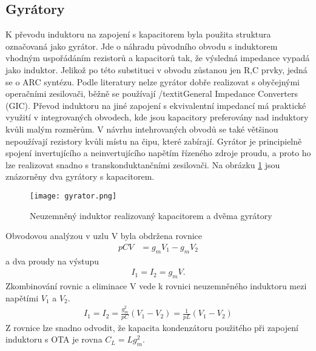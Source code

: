 \subsection{Gyrátory}\label{s:GYR}
\noindent K převodu induktoru na zapojení s kapacitorem byla použita struktura označovaná jako gyrátor. Jde o náhradu původního obvodu s induktorem vhodným uspořádáním rezistorů a kapacitorů tak, že výsledná impedance vypadá jako induktor. Jelikož po této substituci v obvodu zůstanou jen R,C prvky, jedná se o ARC syntézu. Podle literatury \cite{18} nelze gyrátor dobře realizovat s obyčejnými operačními zesilovači, běžně se používají /textit{General Impedance Converters (GIC)}. Převod induktoru na jiné zapojení s ekvivalentní impedancí má praktické využití v integrovaných obvodech, kde jsou kapacitory preferovány nad induktory kvůli malým rozměrům. V návrhu intehrovaných obvodů se také většinou nepoužívají rezistory kvůli místu na čipu, které zabírají. Gyrátor je principielně spojení invertujícího a neinvertujícího napětím řízeného zdroje proudu, a proto ho lze realizovat snadno s transkonduktančními zesilovači. Na obrázku \ref{s:GO} jsou znázorněny dva gyrátory s kapacitorem. 
\begin{figure}[h]
\centering
\texttt{[image: gyrator.png]}
\caption[Neuzemněný induktor realizovaný kapacitorem a dvěma gyrátory]{Neuzemněný induktor realizovaný kapacitorem a dvěma gyrátory \cite{17} \label{s:GO}}
\end{figure}
Obvodovou analýzou v uzlu V byla obdržena rovnice
\begin{align}
pCV &= g_mV_1 - g_mV_2
\end{align}
a dva proudy na výstupu
\begin{align}
I_1 = I_2 = g_mV.
\end{align}
Zkombinování rovnic a eliminace V vede k rovnici neuzemněného induktoru mezi napětími $V_1$ a $V_2$.
\begin{align}
I_1 = I_2 = \frac{g_m^2}{pC}(V_1 - V_2) = \frac{1}{pL}(V_1 - V_2)
\end{align}
Z rovnice lze snadno odvodit, že kapacita kondenzátoru použitého při zapojení induktoru s OTA je rovna $C_L = L g_m ^2$. \\
